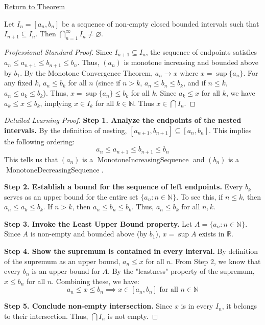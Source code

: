 \newpage
{}
\label{prf:nested-interval-theorem}

\begin{remark*}[Return]
\hyperref[thm:nested-interval-theorem]{Return to Theorem}
\end{remark*}

\begin{theorem*}
Let $I_n = [a_n, b_n]$ be a sequence of non-empty closed bounded intervals such that $I_{n+1} \subseteq I_n$. Then $\bigcap_{n=1}^\infty I_n \neq \varnothing$.
\end{theorem*}

\begin{proof}[Professional Standard Proof]
\LRAProofBodyStart
Since $I_{n+1} \subseteq I_n$, the sequence of endpoints satisfies $a_n \le a_{n+1} \le b_{n+1} \le b_n$. Thus, $(a_n)$ is monotone increasing and bounded above by $b_1$. By the Monotone Convergence Theorem, $a_n \to x$ where $x = \sup \{a_n\}$. For any fixed $k$, $a_n \le b_k$ for all $n$ (since if $n > k$, $a_n \le b_n \le b_k$, and if $n \le k$, $a_n \le a_k \le b_k$). Thus, $x = \sup \{a_n\} \le b_k$ for all $k$. Since $a_k \le x$ for all $k$, we have $a_k \le x \le b_k$, implying $x \in I_k$ for all $k \in \mathbb{N}$. Thus $x \in \bigcap I_n$.
\end{proof}

\begin{proof}[Detailed Learning Proof]
\LRAProofBodyStart

\textbf{Step 1. Analyze the endpoints of the nested intervals.}
By the definition of nesting, $[a_{n+1}, b_{n+1}] \subseteq [a_n, b_n]$. This implies the following ordering:
\[ a_n \le a_{n+1} \le b_{n+1} \le b_n \]
This tells us that $(a_n)$ is a $\operatorname{MonotoneIncreasingSequence}$ and $(b_n)$ is a $\operatorname{MonotoneDecreasingSequence}$.

\textbf{Step 2. Establish a bound for the sequence of left endpoints.}
Every $b_k$ serves as an upper bound for the entire set $\{a_n : n \in \mathbb{N}\}$. To see this, if $n \le k$, then $a_n \le a_k \le b_k$. If $n > k$, then $a_n \le b_n \le b_k$. Thus, $a_n \le b_k$ for all $n, k$.

\textbf{Step 3. Invoke the Least Upper Bound property.}
Let $A = \{a_n : n \in \mathbb{N}\}$. Since $A$ is non-empty and bounded above (by $b_1$), $x = \sup A$ exists in $\mathbb{R}$. 

\textbf{Step 4. Show the supremum is contained in every interval.}
By definition of the supremum as an upper bound, $a_n \le x$ for all $n$.
From Step 2, we know that every $b_n$ is an upper bound for $A$. By the "leastness" property of the supremum, $x \le b_n$ for all $n$.
Combining these, we have:
\[ a_n \le x \le b_n \implies x \in [a_n, b_n] \text{ for all } n \in \mathbb{N} \]

\textbf{Step 5. Conclude non-empty intersection.}
Since $x$ is in every $I_n$, it belongs to their intersection. Thus, $\bigcap I_n$ is not empty.
\end{proof}

